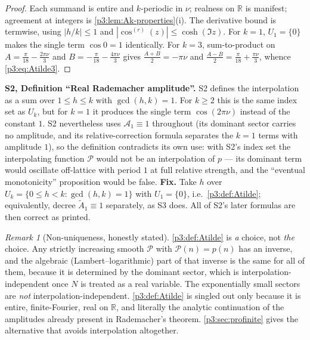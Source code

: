\documentclass[11pt,a4paper,oneside]{book}
\theoremstyle{plain}
\theoremstyle{definition}
\theoremstyle{remark}
\newtheorem{remark}[theorem]{Remark}
\newcommand{\Real}{\mathbb{R}}
\begin{document}
\begin{proof}
Each summand is entire and $k$-periodic in $\nu$; realness on $\Real$ is manifest; agreement at
integers is \cref{p3:lem:Ak-properties}(i). The derivative bound is termwise, using $|h/k|\le1$
and $|\cos^{(r)}(z)|\le\cosh(\Im z)$. For $k=1$, $U_{1}=\{0\}$ makes the single term $\cos0=1$
identically. For $k=3$, sum-to-product on $A=\frac\pi{18}-\frac{2\pi\nu}3$ and
$B=-\frac\pi{18}-\frac{4\pi\nu}3$ gives $\tfrac{A+B}2=-\pi\nu$ and
$\tfrac{A-B}2=\frac\pi{18}+\frac{\pi\nu}3$, whence \cref{p3:eq:Atilde3}.
\end{proof}

\begin{repairbox}
\textbf{S2, Definition ``Real Rademacher amplitude''.} S2 defines the interpolation as a sum over
$1\le h\le k$ with $\gcd(h,k)=1$. For $k\ge2$ this is the same index set as $U_{k}$, but for $k=1$
it produces the single term $\cos(2\pi\nu)$ instead of the constant $1$. S2 nevertheless uses
$\mathcal A_{1}\equiv1$ throughout (its dominant sector carries no amplitude, and its
relative-correction formula separates the $k=1$ terms with amplitude $1$), so the definition
contradicts its own use: with S2's index set the interpolating function $\mathcal{P}$ would not be
an interpolation of $p$ --- its dominant term would oscillate off-lattice with period $1$ at full
relative strength, and the ``eventual monotonicity'' proposition would be false. \textbf{Fix.}
Take $h$ over $U_{k}=\{0\le h<k:\gcd(h,k)=1\}$ with $U_{1}=\{0\}$, i.e.\ \cref{p3:def:Atilde};
equivalently, decree $\widetilde A_{1}\equiv1$ separately, as S3 does. All of S2's later formulas
are then correct as printed.
\end{repairbox}

\begin{remark}[Non-uniqueness, honestly stated]\label{p3:rem:interp-nonunique}
\cref{p3:def:Atilde} is \emph{a} choice, not \emph{the} choice. Any strictly increasing smooth
$\mathcal{P}$ with $\mathcal{P}(n)=p(n)$ has an inverse, and the algebraic (Lambert--logarithmic)
part of that inverse is the same for all of them, because it is determined by the dominant sector,
which is interpolation-independent once $N$ is treated as a real variable. The exponentially small
sectors are \emph{not} interpolation-independent. \cref{p3:def:Atilde} is singled out only because
it is entire, finite-Fourier, real on $\Real$, and literally the analytic continuation of the
amplitudes already present in Rademacher's theorem. \cref{p3:sec:profinite} gives the alternative
that avoids interpolation altogether.
\end{remark}
\end{document}
